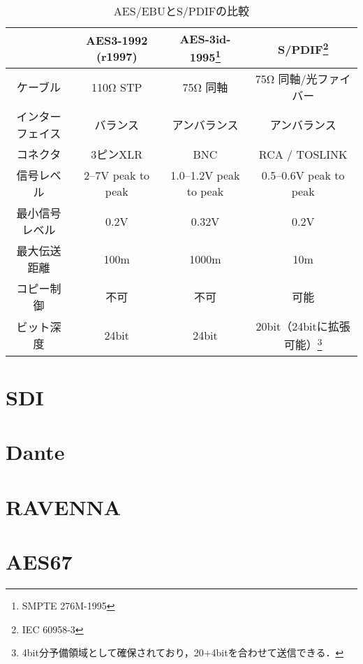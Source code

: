 \begin{table}[htb]
  \label{tab:compare}
  \caption{AES/EBUとS/PDIFの比較\cite{aesebuandspdif}}
  \begin{tabular}{c|ccc} \hline
    & AES3-1992 (r1997) & AES-3id-1995\footnote{SMPTE 276M-1995} & S/PDIF\footnote{IEC 60958-3} \\ \hline \hline
    ケーブル & 110Ω STP & 75Ω 同軸 & 75Ω 同軸/光ファイバー \\
    インターフェイス & バランス & アンバランス & アンバランス \\
    コネクタ & 3ピンXLR & BNC & RCA / TOSLINK \\
    信号レベル & 2--7V peak to peak & 1.0--1.2V peak to peak & 0.5--0.6V peak to peak \\
    最小信号レベル & 0.2V & 0.32V & 0.2V \\
    最大伝送距離 & 100m & 1000m & 10m \\
    コピー制御 & 不可 & 不可 & 可能 \\
    ビット深度 & 24bit & 24bit & 20bit（24bitに拡張可能）\footnote{4bit分予備領域として確保されており，20+4bitを合わせて送信できる．} \\ \hline
  \end{tabular}
\end{table}

\section{SDI}

\section{Dante}

\section{RAVENNA}

\section{AES67}
